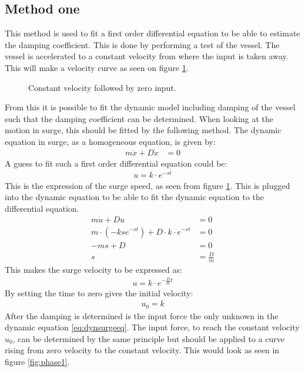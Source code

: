 \subsection{Method one}
\label{subsec:methodone}
This method is used to fit a first order differential equation to be able to estimate the damping coefficient. This is done by performing a test of the vessel. The vessel is accelerated to a constant velocity from where the input is taken away. This will make a velocity curve as seen on figure \ref{fig:phase3}.
\begin{figure}[htbp]
	\centering
	
	\caption{Constant velocity followed by zero input.}
	\label{fig:phase3}
\end{figure}
From this it is possible to fit the dynamic model including damping of the vessel such that the damping coefficient can be determined. When looking at the motion in surge, this should be fitted by the following method. The dynamic equation in surge, as a homogeneous equation, is given by:
\begin{align}
m \ddot x + D \dot x &= 0
\label{eq:dynsurgeeq}
\end{align}
A guess to fit such a first order differential equation could be:
\begin{align}
u = k \cdot e^{-st}
\end{align}
This is the expression of the surge speed, as seen from figure \ref{fig:phase3}. This is plugged into the dynamic equation to be able to fit the dynamic equation to the differential equation.
\begin{align}
m \dot u + Du &= 0\\
m \cdot (-kse^{-st}) + D \cdot k \cdot e^{-st} &= 0\\
-ms+D&=0\\
s&=\frac{D}{m}
\end{align}
This makes the surge velocity to be expressed as:
\begin{align}
u = k \cdot e^{-\frac{D}{m}t}
\end{align}
By setting the time to zero gives the initial velocity:
\begin{align}
u_0 = k
\end{align}
After the damping is determined is the input force the only unknown in the dynamic equation \eqref{eq:dynsurgeeq}. The input force, to reach the constant velocity $u_0$, can be determined by the same principle but should be applied to a curve rising from zero velocity to the constant velocity. This would look as seen in figure \ref{fig:phase1}.
